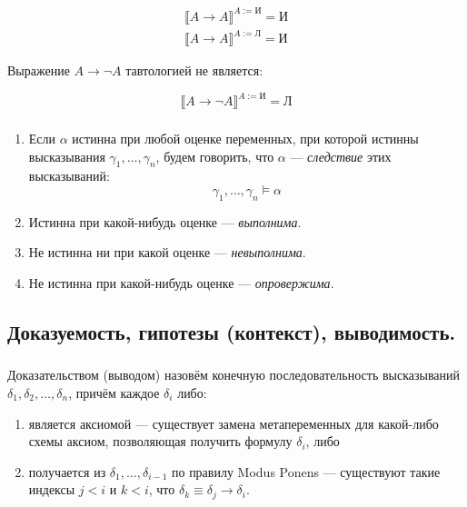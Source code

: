 \documentclass[10pt,a4paper,oneside]{article}
\begin{document}
$$
\begin{array}{l} \llbracket A\rightarrow A \rrbracket ^ {A := \textit{И}} = \textit{И} \\
 \llbracket A\rightarrow A \rrbracket ^ {A := \textit{Л}} = \textit{И} \end{array}
$$

Выражение $A\rightarrow\neg A$ тавтологией не является:

$$\llbracket A\rightarrow\neg A \rrbracket ^ {A := \textit{И}} = \textit{Л}$$

\subsubsection{}
\begin{enumerate}
    \item Если $\alpha$ истинна при любой оценке переменных, при которой истинны 
    высказывания $\gamma_1, \dots, \gamma_n$, будем говорить, что $\alpha$ --- \emph{следствие} этих высказываний:
    $$\gamma_1, \dots, \gamma_n \models \alpha$$
    \item Истинна при какой-нибудь оценке --- \emph{выполнима}.
    \item Не истинна ни при какой оценке --- \emph{невыполнима}.
    \item Не истинна при какой-нибудь оценке --- \emph{опровержима}.
\end{enumerate}

\subsection{Доказуемость, гипотезы (контекст), выводимость.}
\subsubsection{}
Доказательством (выводом) назовём конечную последовательность высказываний $\delta_1, \delta_2, \dots, \delta_n$,
причём каждое $\delta_i$ либо:
\begin{enumerate}
\item является аксиомой --- существует замена метапеременных для какой-либо схемы аксиом, позволяющая получить
формулу $\delta_i$, либо
\item получается из $\delta_1,\dots,\delta_{i-1}$ по правилу Modus Ponens --- существуют такие индексы $j < i$ и $k < i$,
что $\delta_k \equiv \delta_j\rightarrow\delta_i$.
\end{enumerate}

\subsubsection{}
\end{document}

